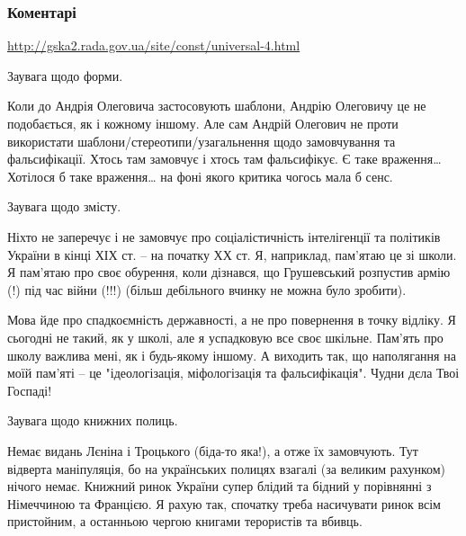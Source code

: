  
 
 
 
 
\subsubsection{Коментарі}
\label{sec:13_09_2021.fb.baumejster_andrej.kiev.filosof.1.filosofia_istoria_socializm_marks.cmt}

\begin{itemize} %
\url{http://gska2.rada.gov.ua/site/const/universal-4.html}

Заувага щодо форми.

Коли до Андрія Олеговича застосовують шаблони, Андрію Олеговичу це не
подобається, як і кожному іншому. Але сам Андрій Олегович не проти використати
шаблони/стереотипи/узагальнення щодо замовчування та фальсифікації. Хтось там
замовчує і хтось там фальсифікує. Є таке враження… Хотілося б таке враження… на
фоні якого критика чогось мала б сенс.

Заувага щодо змісту.

Ніхто не заперечує і не замовчує про соціалістичність інтелігенції та політиків
України в кінці ХІХ ст. – на початку ХХ ст. Я, наприклад, пам'ятаю це зі школи.
Я пам'ятаю про своє обурення, коли дізнався, що Грушевський розпустив армію (!)
під час війни (!!!) (більш дебільного вчинку не можна було зробити).

Мова йде про спадкоємність державності, а не про повернення в точку відліку. Я
сьогодні не такий, як у школі, але я успадковую все своє шкільне. Пам'ять про
школу важлива мені, як і будь-якому іншому. А виходить так, що наполягання на
моїй пам'яті – це "ідеологізація, міфологізація та фальсифікація". Чудни дєла
Твоі Госпаді!

Заувага щодо книжних полиць.

Немає видань Лєніна і Троцького (біда-то яка!), а отже їх замовчують. Тут
відверта маніпуляція, бо на українських полицях взагалі (за великим рахунком)
нічого немає. Книжний ринок України супер блідий та бідний у порівнянні з
Німеччиною та Францією. Я рахую так, спочатку треба насичувати ринок всім
пристойним, а останньою чергою книгами терористів та вбивць.


\end{itemize}
